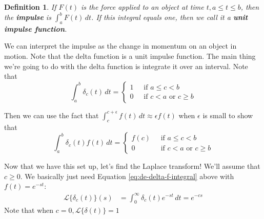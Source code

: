\documentclass[letterpaper, 11pt, openany]{book}
\theoremstyle{mytheoremstyle}
\newtheorem{definition}{Definition}[section]
\theoremstyle{myexamplestyle}
\begin{document}
\begin{definition}\label{def:unit-impulse}
    If \(F(t)\) is the force applied to an object at time \(t, a \leq t \leq b\), then the \textbf{impulse} is \(\displaystyle \int_a^b F(t) \, dt\). If this integral equals one, then we call it a \textbf{unit impulse function}.
\end{definition}

We can interpret the impulse as the change in momentum on an object in motion. Note that the delta function is a unit impulse function. The main thing we're going to do with the delta function is integrate it over an interval. Note that
\[ \int_{a}^{b} \delta_{c}(t) \, dt = \begin{cases}
   1 \; &\text{ if } a \leq c < b\\
   0  \; &\text{ if } c < a \text{ or } c \geq b
\end{cases}\]

Then we can use the fact that \(\displaystyle \int_{c}^{c + \epsilon} f(t)\, dt \approx \epsilon f(t)\) when \(\epsilon\) is small to show that
\begin{equation}\label{eq:de-delta-f-integral}
    \int_{a}^{b} \delta_{c}(t)f(t) \, dt = \begin{cases}
    f(c)  \; &\text{ if } a \leq c < b\\
    0  \; &\text{ if } c < a \text{ or } c \geq b
\end{cases}
\end{equation}

Now that we have this set up, let's find the Laplace transform! We'll assume that \(c \geq 0\). We basically just need Equation \ref{eq:de-delta-f-integral} above with \(f(t) = e^{-st}\):
\begin{align}\label{eq:de-Laplace-delta}
    \mathcal{L}\{\delta_{c}(t)\}(s) &= \int_{0}^{\infty} \delta_{c}(t) e^{-st} \, dt = e^{-cs}
\end{align}
Note that when \(c = 0, \mathcal{L}\{\delta(t)\} = 1\)\ \faSmile
\end{document}

